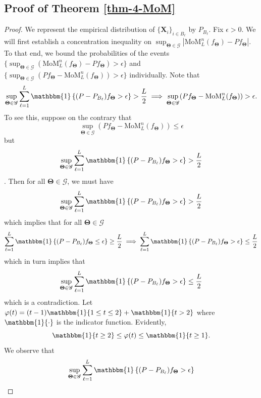 \documentclass{article}
\newcommand{\bX}{\boldsymbol{X}}
\newcommand{\bTheta}{\boldsymbol{\Theta}}
\newcommand{\cL}{\mathcal{L}}
\newcommand{\cO}{\mathcal{O}}
\newcommand{\one}{\mathbbm{1}}
\begin{document}
\subsection{Proof of Theorem \ref{thm-4-MoM}}

\begin{proof} 
We represent the empirical distribution of $\{\bX_i\}_{i \in B_\ell}$ by $P_{B_{\ell}}$. Fix $\epsilon>0$. We will first establish a concentration inequality on $\sup_{\bTheta \in \mathscr{G}} |\text{MoM}_L^n (f_{\bTheta}) - P f_{\bTheta} |$. To that end, we bound the probabilities of the events $\{\sup_{\bTheta \in \mathscr{G}}(\text{MoM}_L^n (f_{\bTheta}) - P f_{\bTheta}) >\epsilon\}$ and $\{\sup_{\bTheta \in \mathscr{G}}  ( P f_{\bTheta} - \text{MoM}_L^n (f_{\bTheta})) > \epsilon\}$ individually. Note that 
\begin{equation}
\sup_{\bTheta \in \mathscr{G}}\sum_{\ell = 1}^L \one\left\{(P-P_{B_\ell})f_{\bTheta} > \epsilon\right\} > \frac{L}{2} \implies \sup_{\bTheta \in \mathscr{G}} (P f_{\bTheta} - \text{MoM}_L^n (f_{\bTheta})) > \epsilon.
\end{equation}
To see this, suppose on the contrary that \[\sup_{\bTheta \in \mathscr{G}}  (P f_{\bTheta} - \text{MoM}_L^n (f_{\bTheta})) \le \epsilon\] but \[\sup_{\bTheta \in \mathscr{G}}\sum_{\ell = 1}^L \one\left\{(P-P_{B_\ell})f_{\bTheta} > \epsilon\right\} > \frac{L}{2}\]. 
Then for all $\bm{\Theta}\in \mathscr{G}$, we must have \[\sup_{\bTheta \in \mathscr{G}}\sum_{\ell = 1}^L \one\left\{(P-P_{B_\ell})f_{\bTheta} > \epsilon\right\} > \frac{L}{2}\] which implies that for all $\bm{\Theta}\in \mathscr{G}$ \[\sum_{\ell = 1}^L \one\left\{(P-P_{B_\ell})f_{\bTheta} \le \epsilon\right\} \ge \frac{L}{2} \implies \sum_{\ell = 1}^L \one\left\{(P-P_{B_\ell})f_{\bTheta} > \epsilon\right\} \le \frac{L}{2}\] which in turn implies that \[\sup_{\bTheta \in \mathscr{G}}\sum_{\ell = 1}^L \one\left\{(P-P_{B_\ell})f_{\bTheta} > \epsilon\right\} \le \frac{L}{2}\] which is a contradiction. Let $\varphi(t) = (t-1) \one\{1 \le t \le 2\} + \one\{t >2\}$ where $\one\{\cdot\}$ is the indicator function. Evidently,
\begin{equation}
    \label{eq6}
    \one\{t \ge 2\} \le \varphi(t) \le \one\{t \ge 1\}.
\end{equation} 
We observe that
\begingroup
\allowdisplaybreaks
\begin{align}
    \sup_{\bTheta \in \mathscr{G}}\sum_{\ell = 1}^L \one\left\{(P-P_{B_\ell})f_{\bTheta} > \epsilon\right\}

\end{align}
\end{proof}
\end{document}
